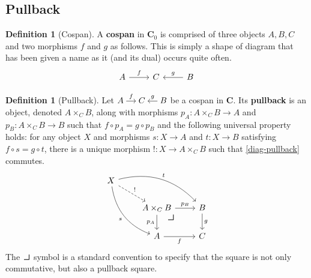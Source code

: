 \documentclass{article}
\theoremstyle{definition}
\newtheorem{defn}[thm]{Definition}
\theoremstyle{remark}
\newcommand{\pullback}{\mbox{\LARGE$\lrcorner$}}
\begin{document}
\subsection{Pullback}
\begin{defn}[Cospan]
    A \textbf{cospan} in $\mathbf{C}_0$ is comprised of three objects $A,B,C$ and two morphisms $f$ and $g$ as follows. This is simply a shape of diagram that has been given a name as it (and its dual) occurs quite often.
    \begin{equation*}
        \begin{tikzcd}
            A \arrow[r, "f"] & C & B \arrow[l, "g"']
        \end{tikzcd}
    \end{equation*}
\end{defn}
\begin{defn}[Pullback]
    Let $\begin{tikzcd}[cramped, sep=small] A \arrow[r, "f"] & C & B \arrow[l, "g"'] \end{tikzcd}$ be a cospan in $\mathbf{C}$. Its \textbf{pullback} is an object, denoted $A \times_C B$, along with morphisms $p_A:A\times_C B \rightarrow A$ and $p_B:A\times_C B \rightarrow B$ such that $f\circ p_A= g \circ p_B$ and the following universal property holds: for any object $X$ and morphisms $s: X \rightarrow A$ and $t: X \rightarrow B$ satisfying $f \circ s = g \circ t$, there is a unique morphism $!:X \rightarrow A\times_C B$ such that \eqref{diag-pullback} commutes.
    \begin{equation}\label{diag-pullback}
        \begin{tikzcd}
            X \arrow[rdd, "s"', bend right] \arrow[rrd, "t", bend left] \arrow[rd, "!", dashed] &  &  \\
                 & A\times_C B \arrow[d, "p_A"'] \arrow[r, "p_B"] \arrow[dr, phantom, "\pullback", very near start] & B \arrow[d, "g"] \\
                 & A \arrow[r, "f"'] & C
        \end{tikzcd}
    \end{equation}
    The $\pullback$ symbol is a standard convention to specify that the square is not only commutative, but also a pullback square.
\end{defn}
\end{document}
